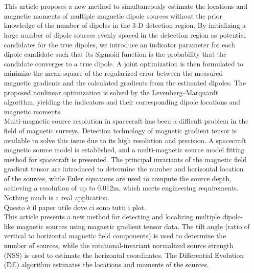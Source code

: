 \chapter{}

\cite{DetectionMultiplMagnetiDipoleSources}
This article proposes a new method to simultaneously estimate the locations and magnetic moments of multiple magnetic dipole sources without the prior knowledge of the number of dipoles in the 3-D detection region. By initializing a large number of dipole sources evenly spaced in the detection region as potential candidates for the true dipoles, we introduce an indicator parameter for each dipole candidate such that its Sigmoid function is the probability that the candidate converges to a true dipole. A joint optimization is then formulated to minimize the mean square of the regularized error between the measured magnetic gradients and the calculated gradients from the estimated dipoles. The proposed nonlinear optimization is solved by the Levenberg–Marquardt algorithm, yielding the indicators and their corresponding dipole locations and magnetic moments.
\\

\cite{multiple_in_spacecraft}
Multi-magnetic source resolution in spacecraft has been a difficult problem in the field of magnetic surveys. Detection technology of magnetic gradient tensor is available to solve this issue due to its high resolution and precision. A spacecraft magnetic source model is established, and a multi-magnetic source model fitting method for spacecraft is presented. The principal invariants of the magnetic field gradient tensor are introduced to determine the number and horizontal location of the sources, while Euler equations are used to compute the source depth, achieving a resolution of up to 0.012m, which meets engineering requirements.
\\

\cite{real_application}
Nothing much is a real application.
\\

\cite{multiple_plots}
Questo è il paper utile dove ci sono tutti i plot.
\\

\cite{multiple_DE_NSS_big_matrix}
This article presents a new method for detecting and localizing multiple dipole-like magnetic sources using magnetic gradient tensor data. The tilt angle (ratio of vertical to horizontal magnetic field components) is used to determine the number of sources, while the rotational-invariant normalized source strength (NSS) is used to estimate the horizontal coordinates. The Differential Evolution (DE) algorithm estimates the locations and moments of the sources.
\\

